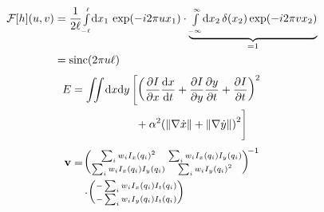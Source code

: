 {}
\begin{equation}
	\begin{split}
		\mathcal{F}[h](u,v)&=\frac{1}{2\ell}{\scriptstyle\int\limits_{-\ell}^{\ell}}\mathrm d x_1\, \exp\!\left( -i2\pi ux_1 \right)
		\cdot\underbrace{{\scriptstyle\int\limits_{-\infty}^{\infty}}\mathrm d x_2\, \delta(x_2)\exp\!\left( -i2\pi vx_2 \right)}_{=1}\\
		&=\operatorname{sinc}\!\left(2\pi u\ell  \right)
	\end{split}
	\label{eq:motionblur1}
\end{equation}
\begin{equation}
	\begin{split}
		E&=\iint_{}^{}\!\dd{x}\!\dd{y}\left[\left( \pdv{I}{x}\dv{x}{t}+\pdv{I}{y}\pdv{y}{t}+\pdv{I}{t} \right)^2\right.\\
			&\hphantom{\iint_{}^{}\!\dd{x}\!\dd{y}\left[\right.\quad}\left.\vphantom{\iint_{}^{}\!\dd{x}\!\dd{y}\left[\left( \pdv{I}{x}\dv{x}{t}+\pdv{I}{y}\pdv{y}{t}+\pdv{I}{t} \right)^2\right.}
	+\alpha^2\!\left( \norm{\nabla \dot{x}} +\norm{\nabla\dot{y}}\right)^2  \right]
	\end{split}
	\label{eq:2dimstreams}
\end{equation}
\begin{equation}
	\begin{split}
		\vtr{v}&=
		\!{\left(\!\begin{smallmatrix}
			\sum_{i}^{}w_iI_x(q_i)^2&\sum_{i}^{}w_iI_x(q_i)I_y(q_i)\\
			\sum_{i}^{}w_iI_x(q_i)I_y(q_i)&\sum_{i}^{}w_iI_y(q_i)^2
		\end{smallmatrix}\!
	\right)\!}^{-1}\\
	&\quad\cdot 
	\!\left(\!\begin{smallmatrix}
		-\sum_{i}^{}w_iI_x(q_i)I_t(q_i)\\
		-\sum_{i}^{}w_iI_y(q_i)I_t(q_i)
	\end{smallmatrix}\!\right)\!
	\label{eq:lucaskanade2}
	\end{split}
\end{equation}
		
